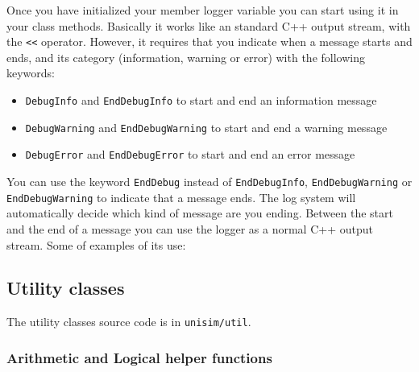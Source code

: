 Once you have initialized your member logger variable you can start using it in your class methods. Basically it works like an standard C++ output stream, with the \texttt{<<} operator. However, it requires that you indicate when a message starts and ends, and its category (information, warning or error) with the following keywords:
\begin{itemize}
\item \texttt{DebugInfo} and \texttt{EndDebugInfo} to start and end an information message
\item \texttt{DebugWarning} and \texttt{EndDebugWarning} to start and end a warning message
\item \texttt{DebugError} and \texttt{EndDebugError} to start and end an error message
\end{itemize}

You can use the keyword \texttt{EndDebug} instead of \texttt{EndDebugInfo}, \texttt{EndDebugWarning} or \texttt{EndDebugWarning} to indicate that a message ends. The log system will automatically decide which kind of message are you ending. Between the start and the end of a message you can use the logger as a normal C++ output stream. Some of examples of its use:
\begin{center}
	
\end{center}

\newpage
\subsection{Utility classes}
\label{tms320c3x_utils}

The utility classes source code is in \texttt{unisim/util}.

\subsubsection{Arithmetic and Logical helper functions}

